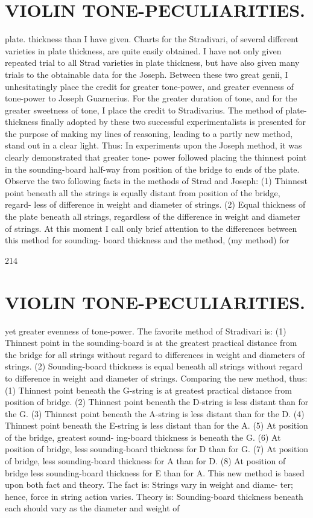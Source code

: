 \documentclass{article}
\begin{document}
\section*{VIOLIN TONE-PECULIARITIES.}
plate. thickness than I have given. Charts for the Stradivari, of several different varieties in plate thickness, are quite easily obtained. I have not only given repeated trial to all Strad varieties in plate thickness, but have also given many trials to the obtainable data for the Joseph. Between these two great genii, I unhesitatingly place the credit for greater tone-power, and greater evenness of tone-power to Joseph Guarnerius. For the greater duration of tone, and for the greater sweetness of tone, I place the credit to Stradivarius. The method of plate-thickness finally adopted by these two successful experimentalists is presented for the purpose of making my lines of reasoning, leading to a partly new method, stand out in a clear light. Thus: In experiments upon the Joseph method, it was clearly demonstrated that greater tone- power followed placing the thinnest point in the sounding-board half-way from position of the bridge to ends of the plate. Observe the two following facts in the methods of Strad and Joseph: (1) Thinnest point beneath all the strings is equally distant from position of the bridge, regard- less of difference in weight and diameter of strings. (2) Equal thickness of the plate beneath all strings, regardless of the difference in weight and diameter of strings. At this moment I call only brief attention to the differences between this method for sounding- board thickness and the method, (my method) for

214

\section*{VIOLIN TONE-PECULIARITIES.}
yet greater evenness of tone-power. The favorite method of Stradivari is: (1) Thinnest point in the sounding-board is at the greatest practical distance from the bridge for all strings without regard to differences in weight and diameters of strings. (2) Sounding-board thickness is equal beneath all strings without regard to difference in weight and diameter of strings. Comparing the new method, thus: (1) Thinnest point beneath the G-string is at greatest practical distance from position of bridge. (2) Thinnest point beneath the D-string is less distant than for the G. (3) Thinnest point beneath the A-string is less distant than for the D. (4) Thinnest point beneath the E-string is less distant than for the A. (5) At position of the bridge, greatest sound- ing-board thickness is beneath the G. (6) At position of bridge, less sounding-board thickness for D than for G. (7) At position of bridge, less sounding-board thickness for A than for D. (8) At position of bridge less sounding-board thickness for E than for A. This new method is based upon both fact and theory. The fact is: Strings vary in weight and diame- ter; hence, force in string action varies. Theory is: Sounding-board thickness beneath each should vary as the diameter and weight of
\end{document}
